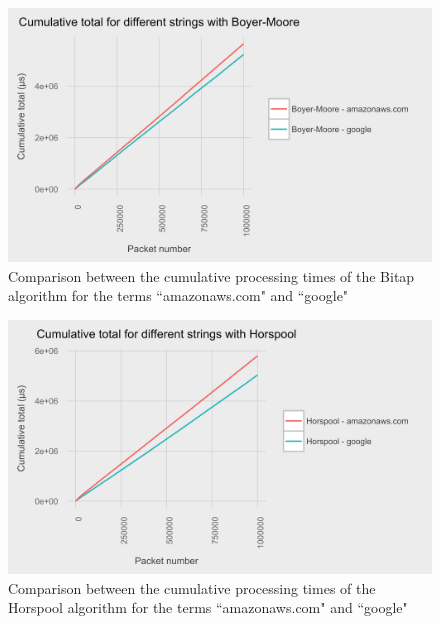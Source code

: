 \documentclass{article}
\begin{document}
\begin{figure}[h!bt]
  \centering
  \includegraphics[width=\textwidth]{graphs/term_length_compare-boyer-moore.png}
  \caption{Comparison between the cumulative processing times of the Bitap algorithm for the terms ``amazonaws.com" and ``google"}
\end{figure}

\begin{figure}[h!bt]
  \centering
  \includegraphics[width=\textwidth]{graphs/term_length_compare-horspool.png}
  \caption{Comparison between the cumulative processing times of the Horspool algorithm for the terms ``amazonaws.com" and ``google"}
\end{figure}
\end{document}
